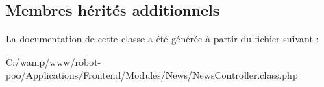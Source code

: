 \subsection*{Membres hérités additionnels}


La documentation de cette classe a été générée à partir du fichier suivant \+:\begin{DoxyCompactItemize}
\item 
C\+:/wamp/www/robot-\/poo/\+Applications/\+Frontend/\+Modules/\+News/News\+Controller.\+class.\+php\end{DoxyCompactItemize}
